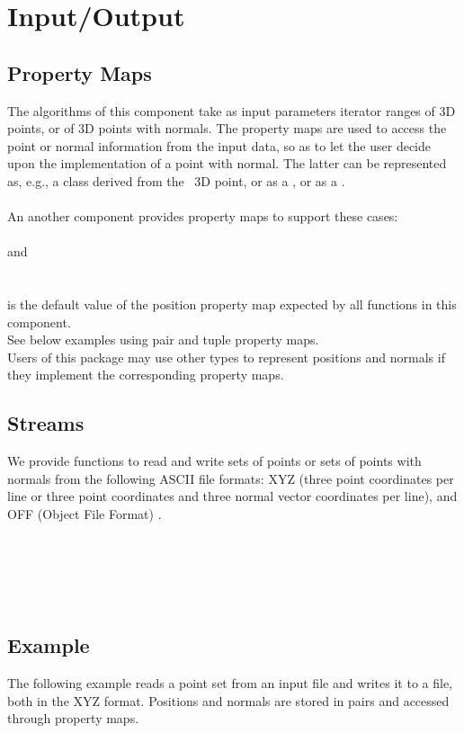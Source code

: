 \section{Input/Output}


\subsection{Property Maps}

The algorithms of this component take as input parameters iterator ranges of 3D points, or of 3D points with normals. The property maps are used to access the point or normal information from the input data, so as to let the user decide upon the implementation of a point with normal. The latter can be represented as, e.g., a class derived from the \cgal\ 3D point, or as a
, or as a .\\
\\
An another component provides property maps to support these cases:  \\
  \\
 and   \\
  \\
\\
 is the default value of the position property map expected by all functions in this component. \\
See below examples using pair and tuple property maps. \\
Users of this package may use other types to represent positions and normals if they implement the corresponding property maps.


\subsection{Streams}

We provide functions to read and write sets of points or sets of points with normals from the following ASCII file formats: XYZ (three point coordinates  per line or three point coordinates and three normal vector coordinates  per line), and OFF (Object File Format) \cite{cgal:p-gmgv16-96}.

  \\
  \\
 \\
 \\


\subsection{Example}

The following example reads a point set from an input file and writes it to a file, both in the XYZ format. Positions and normals are stored in pairs and accessed through property maps.
